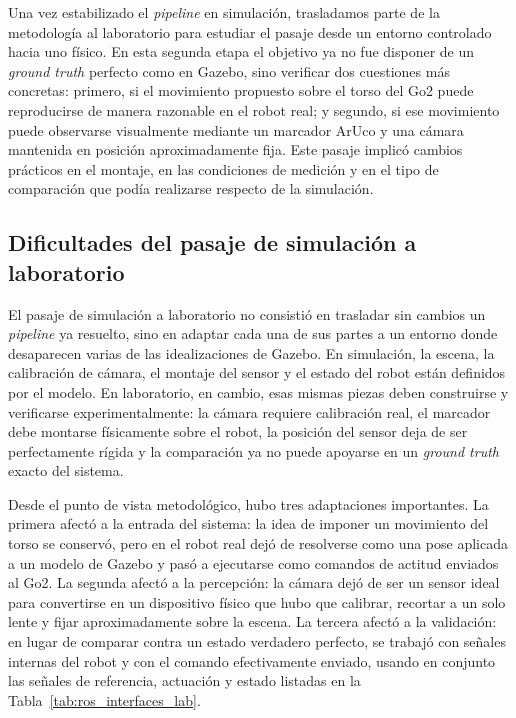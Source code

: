\documentclass[12pt,a4paper]{report}
\begin{document}
Una vez estabilizado el \textit{pipeline} en simulación, trasladamos parte de la
metodología al laboratorio para estudiar el pasaje desde un entorno controlado
hacia uno físico. En esta segunda etapa el objetivo ya no fue disponer de un
\textit{ground truth} perfecto como en Gazebo, sino verificar dos cuestiones más
concretas: primero, si el movimiento propuesto sobre el torso del Go2 puede
reproducirse de manera razonable en el robot real; y segundo, si ese movimiento
puede observarse visualmente mediante un marcador ArUco y una cámara mantenida
en posición aproximadamente fija. Este pasaje implicó cambios prácticos en el
montaje, en las condiciones de medición y en el tipo de comparación que podía
realizarse respecto de la simulación.

\subsection{Dificultades del pasaje de simulación a laboratorio}

El pasaje de simulación a laboratorio no consistió en trasladar sin cambios un
\textit{pipeline} ya resuelto, sino en adaptar cada una de sus partes a un entorno donde
desaparecen varias de las idealizaciones de Gazebo. En simulación, la escena, la
calibración de cámara, el montaje del sensor y el estado del robot están
definidos por el modelo. En laboratorio, en cambio, esas mismas piezas deben
construirse y verificarse experimentalmente: la cámara requiere calibración
real, el marcador debe montarse físicamente sobre el robot, la posición del
sensor deja de ser perfectamente rígida y la comparación ya no puede apoyarse en
un \textit{ground truth} exacto del sistema.

Desde el punto de vista metodológico, hubo tres adaptaciones importantes. La
primera afectó a la entrada del sistema: la idea de imponer un movimiento del
torso se conservó, pero en el robot real dejó de resolverse como una pose
aplicada a un modelo de Gazebo y pasó a ejecutarse como comandos de actitud
enviados al Go2. La segunda afectó a la percepción: la cámara dejó de ser un
sensor ideal para convertirse en un dispositivo físico que hubo que calibrar,
recortar a un solo lente y fijar aproximadamente sobre la escena. La tercera
afectó a la validación: en lugar de comparar contra un estado verdadero
perfecto, se trabajó con señales internas del robot y con el comando
efectivamente enviado, usando en conjunto las señales de referencia, actuación y
estado listadas en la Tabla~\ref{tab:ros_interfaces_lab}.
\end{document}
